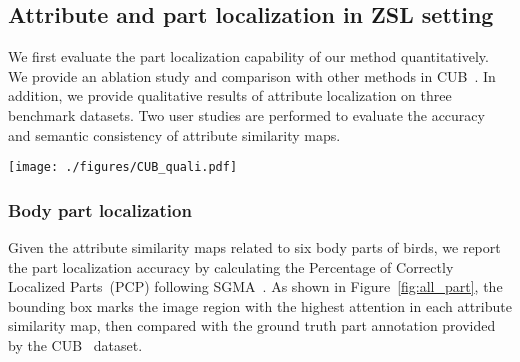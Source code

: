 \subsection{Attribute and part localization in ZSL setting}

We first evaluate the part localization capability of our method quantitatively. We provide an ablation study and comparison with other methods in CUB~\citep{26_wah2011caltech}. In addition, we provide qualitative results of attribute localization on three benchmark datasets. Two user studies are performed to evaluate the accuracy and semantic consistency of attribute similarity maps.

\begin{figure*}[t]
  \centering
\texttt{[image: ./figures/CUB\_quali.pdf]}
    \caption{ Part and attribute localization on CUB.
        Left: 
        Attention maps for each body part of Mallard generated by our \texttt{APN}~(first row) and the baseline model \texttt{BaseMod} visualized by \texttt{CAM}~(\texttt{BaseMod(C)}, second row). Boxes mark out the area with the highest attention.
        Attention maps are min-max normalized for visualization.  Green~(purple) box outside the image indicates a correct~(incorrect) localization. 
}
  \label{fig:all_part}
\end{figure*}


\subsubsection{Body part localization}





Given the attribute similarity maps related to six body parts of birds, we report the part localization accuracy by calculating the Percentage of Correctly Localized Parts~(PCP) following SGMA~\citep{SGMA}. 
As shown in Figure~\ref{fig:all_part}, the bounding box marks 
the image region with the highest attention in each attribute similarity map, then compared with the ground truth part annotation provided by the CUB~\citep{26_wah2011caltech} dataset.

